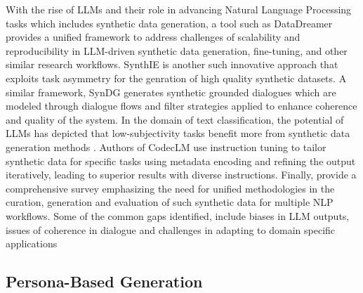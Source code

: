 \documentclass[11pt]{article}
\begin{document}
With the rise of LLMs and their role in advancing Natural Language Processing tasks which includes synthetic data generation, a tool such as DataDreamer \citep{patel-etal-2024-datadreamer} provides a unified framework to address challenges of scalability and reproducibility in LLM-driven synthetic data generation, fine-tuning, and other similar research workflows. SynthIE \citep{josifoski-etal-2023-exploiting} is another such innovative approach that exploits task asymmetry for the genration of high quality synthetic datasets. A similar framework, SynDG \citep{bao-etal-2023-synthetic} generates synthetic grounded dialogues which are modeled through dialogue flows and filter strategies applied to enhance coherence and quality of the system. In the domain of text classification, the potential of LLMs has depicted that low-subjectivity tasks benefit more from synthetic data generation methods \citep{li-etal-2023-synthetic}.  Authors of CodecLM use instruction tuning to tailor synthetic data for specific tasks using metadata encoding and refining the output iteratively, leading to superior results with diverse instructions. Finally, \citep{long-etal-2024-llms} provide a comprehensive survey emphasizing the need for unified methodologies in the curation, generation and evaluation of such synthetic data for multiple NLP workflows. Some of the common gaps identified, include biases in LLM outputs, issues of coherence in dialogue and challenges in adapting to domain specific applications 

\subsection{Persona-Based Generation}
\end{document}
